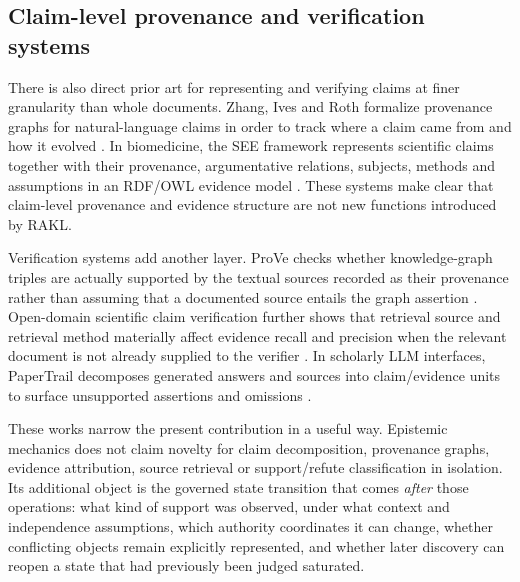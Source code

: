 \subsection{Claim-level provenance and verification systems}

There is also direct prior art for representing and verifying claims at finer granularity than whole documents. Zhang, Ives and Roth formalize provenance graphs for natural-language claims in order to track where a claim came from and how it evolved \cite{zhang2020claim}. In biomedicine, the SEE framework represents scientific claims together with their provenance, argumentative relations, subjects, methods and assumptions in an RDF/OWL evidence model \cite{boelling2014see}. These systems make clear that claim-level provenance and evidence structure are not new functions introduced by RAKL.

Verification systems add another layer. ProVe checks whether knowledge-graph triples are actually supported by the textual sources recorded as their provenance rather than assuming that a documented source entails the graph assertion \cite{amaral2024prove}. Open-domain scientific claim verification further shows that retrieval source and retrieval method materially affect evidence recall and precision when the relevant document is not already supplied to the verifier \cite{vladika2024}. In scholarly LLM interfaces, PaperTrail decomposes generated answers and sources into claim/evidence units to surface unsupported assertions and omissions \cite{martinboyle2026}.

These works narrow the present contribution in a useful way. Epistemic mechanics does not claim novelty for claim decomposition, provenance graphs, evidence attribution, source retrieval or support/refute classification in isolation. Its additional object is the governed state transition that comes \emph{after} those operations: what kind of support was observed, under what context and independence assumptions, which authority coordinates it can change, whether conflicting objects remain explicitly represented, and whether later discovery can reopen a state that had previously been judged saturated.
